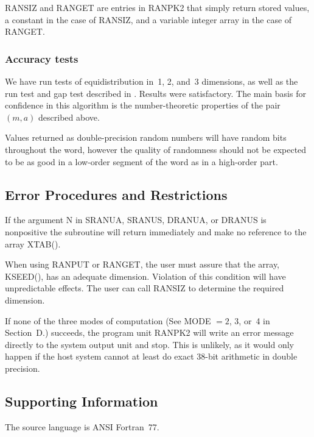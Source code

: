 \documentclass[twoside]{MATH77}
\begin{document}
RANSIZ and RANGET are entries in RANPK2 that simply return stored values, a
constant in the case of RANSIZ, and a variable integer array in the case of
RANGET.

\subsubsection{Accuracy tests}

We have run tests of equidistribution in~1, 2, and~3 dimensions, as well
as the run test and gap test described in \cite{Knuth:1981:ACP}.  Results
were satisfactory.  The main basis for confidence in this algorithm is the
number-theoretic properties of the pair $(m,a)$ described above.

Values returned as double-precision random numbers will have random bits
throughout the word, however the quality of randomness should not be
expected to be as good in a low-order segment of the word as in a high-order
part.




\subsection{Error Procedures and Restrictions}

If the argument N in SRANUA, SRANUS, DRANUA, or DRANUS is nonpositive the
subroutine will return immediately and make no reference to the array XTAB().

When using RANPUT or RANGET, the user must assure that the array, KSEED(),
has an adequate dimension. Violation of this condition will have
unpredictable effects. The user can call RANSIZ to determine the required
dimension.

If none of the three modes of computation (See MODE $= 2$, 3, or~4 in
Section~D.) succeeds, the program unit RANPK2 will write an error message
directly to the system output unit and stop. This is unlikely, as it would
only happen if the host system cannot at least do exact 38-bit arithmetic in
double precision.

\subsection{Supporting Information}

The source language is ANSI Fortran~77.
\end{document}
